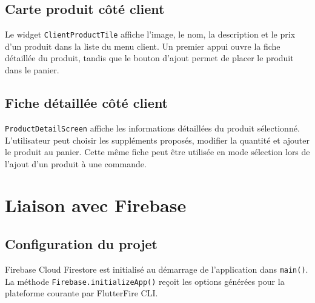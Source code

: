 \documentclass[12pt,a4paper]{report}
\begin{document}


\section{Carte produit côté client}

Le widget \texttt{ClientProductTile} affiche l'image, le nom, la description et
le prix d'un produit dans la liste du menu client. Un premier appui ouvre la
fiche détaillée du produit, tandis que le bouton d'ajout permet de placer le
produit dans le panier.



\section{Fiche détaillée côté client}

\texttt{ProductDetailScreen} affiche les informations détaillées du produit
sélectionné. L'utilisateur peut choisir les suppléments proposés, modifier la
quantité et ajouter le produit au panier. Cette même fiche peut être utilisée
en mode sélection lors de l'ajout d'un produit à une commande.



\chapter{Liaison avec Firebase}

\section{Configuration du projet}

Firebase Cloud Firestore est initialisé au démarrage de l'application dans
\texttt{main()}. La méthode \texttt{Firebase.initializeApp()} reçoit les options
générées pour la plateforme courante par FlutterFire CLI.


\end{document}
